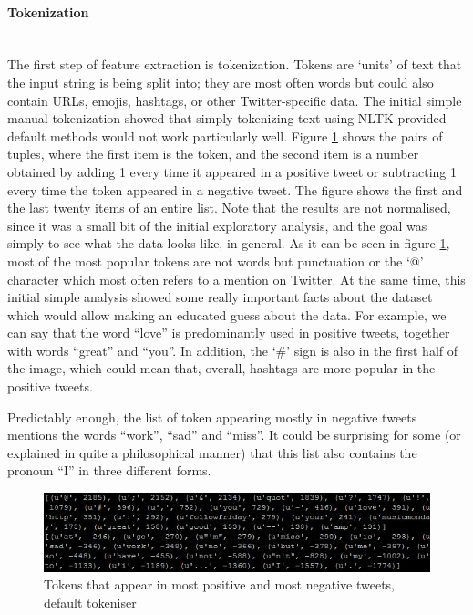 \paragraph{Tokenization}\mbox{}\\
The first step of feature extraction is tokenization. Tokens are `units' of text that the input string is being split into; they are most often words but could also contain URLs, emojis, hashtags, or other Twitter-specific data. The initial simple manual tokenization showed that simply tokenizing text using NLTK provided default methods would not work particularly well. Figure \ref{fig:manual_tok} shows the pairs of tuples, where the first item is the token, and the second item is a number obtained by adding 1 every time it appeared in a positive tweet or subtracting 1 every time the token appeared in a negative tweet. The figure shows the first and the last twenty items of an entire list. Note that the results are not normalised, since it was a small bit of the initial exploratory analysis, and the goal was simply to see what the data looks like, in general. As it can be seen in figure \ref{fig:manual_tok}, most of the most popular tokens are not words but punctuation or the `@' character which most often refers to a mention on Twitter. At the same time, this initial simple analysis showed some really important facts about the dataset which would allow making an educated guess about the data. For example, we can say that the word ``love'' is predominantly used in positive tweets, together with words ``great'' and ``you''. In addition, the `\#' sign is also in the first half of the image, which could mean that, overall, hashtags are more popular in the positive tweets.

Predictably enough, the list of token appearing mostly in negative tweets mentions the words ``work'', ``sad'' and ``miss''. It could be surprising for some (or explained in quite a philosophical manner) that this list also contains the pronoun ``I'' in three different forms. 

\begin{figure}
    \centering
    \includegraphics[width=\textwidth]{most_pos_neg}
    \caption{Tokens that appear in most positive and most negative tweets, default tokeniser}
    \label{fig:manual_tok}
\end{figure}

